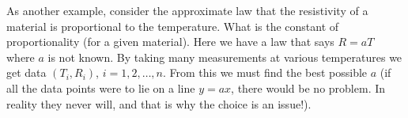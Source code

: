 \documentclass[preprint,  11pt]{amsart}
\theoremstyle{plain} %
\theoremstyle{definition} %
\begin{document}
As another example, consider the approximate law that the resistivity of a  material is proportional to the temperature. What is the constant of proportionality (for a given material). Here we have a law that says $R=aT$ where $a$ is not known. By taking many measurements at various temperatures we get data $(T_{i},R_{i})$, $i=1,2,\ldots ,n$. From this we must find the best possible $a$ (if all the data points were to lie on a line $y=ax$, there would be no problem. In reality they never will, and that is why the choice is an issue!).



\end{document}
